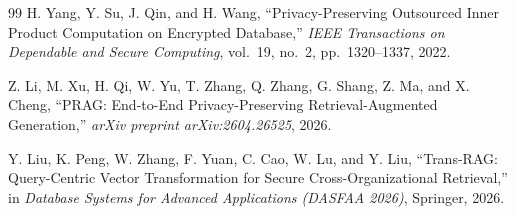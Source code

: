 \documentclass[10pt,a4paper]{article}
\begin{document}
\begin{thebibliography}{99}
 H. Yang, Y. Su, J. Qin, and H. Wang, ``Privacy-Preserving Outsourced Inner Product Computation on Encrypted Database,'' \textit{IEEE Transactions on Dependable and Secure Computing}, vol.~19, no.~2, pp.~1320--1337, 2022.

 Z. Li, M. Xu, H. Qi, W. Yu, T. Zhang, Q. Zhang, G. Shang, Z. Ma, and X. Cheng, ``PRAG: End-to-End Privacy-Preserving Retrieval-Augmented Generation,'' \textit{arXiv preprint arXiv:2604.26525}, 2026.

 Y. Liu, K. Peng, W. Zhang, F. Yuan, C. Cao, W. Lu, and Y. Liu, ``Trans-RAG: Query-Centric Vector Transformation for Secure Cross-Organizational Retrieval,'' in \textit{Database Systems for Advanced Applications (DASFAA 2026)}, Springer, 2026.

\end{thebibliography}
\end{document}
